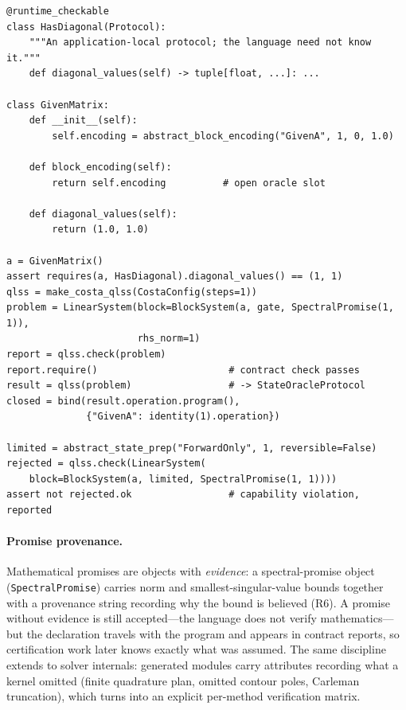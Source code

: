 \begin{lstlisting}[style=pyqpython, caption={Protocols in action (adapted verbatim from \texttt{examples/algorithm\_contracts.py}).  Top: an application-defined protocol \texttt{HasDiagonal}, satisfied structurally by an ordinary class whose block-encoding slot is an open declaration.  Bottom: a Costa-QLSS instance consumes the problem object, its contract check succeeds, the solver runs, and the resulting open program is closed by binding an implementation to the \texttt{GivenA} slot.}, label={lst:contracts}]
@runtime_checkable
class HasDiagonal(Protocol):
    """An application-local protocol; the language need not know it."""
    def diagonal_values(self) -> tuple[float, ...]: ...

class GivenMatrix:
    def __init__(self):
        self.encoding = abstract_block_encoding("GivenA", 1, 0, 1.0)

    def block_encoding(self):
        return self.encoding          # open oracle slot

    def diagonal_values(self):
        return (1.0, 1.0)

a = GivenMatrix()
assert requires(a, HasDiagonal).diagonal_values() == (1, 1)
qlss = make_costa_qlss(CostaConfig(steps=1))
problem = LinearSystem(block=BlockSystem(a, gate, SpectralPromise(1, 1)),
                       rhs_norm=1)
report = qlss.check(problem)
report.require()                       # contract check passes
result = qlss(problem)                 # -> StateOracleProtocol
closed = bind(result.operation.program(),
              {"GivenA": identity(1).operation})

limited = abstract_state_prep("ForwardOnly", 1, reversible=False)
rejected = qlss.check(LinearSystem(
    block=BlockSystem(a, limited, SpectralPromise(1, 1))))
assert not rejected.ok                 # capability violation, reported
\end{lstlisting}

\paragraph{Promise provenance.}
Mathematical promises are objects with \emph{evidence}: a spectral-promise
object (\texttt{SpectralPromise}) carries norm and smallest-singular-value
bounds together with a provenance string recording why the bound is
believed (R6).
A promise without evidence is still accepted---the language does not verify
mathematics---but the declaration travels with the program and appears in
contract reports, so certification work later knows exactly what was
assumed.  The same discipline extends to solver internals: generated modules
carry attributes recording what a kernel omitted (finite quadrature plan,
omitted contour poles, Carleman truncation), which
 turns into an explicit per-method verification
matrix.

